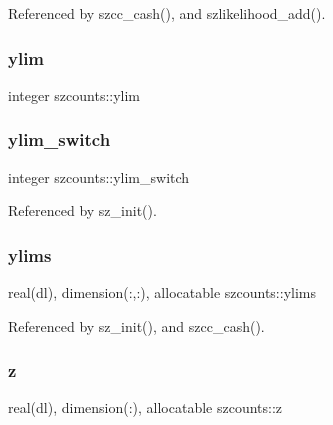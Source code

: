 Referenced by szcc\+\_\+cash(), and szlikelihood\+\_\+add().

\mbox{\label{namespaceszcounts_a2113fbfc3fd3f4f7d482dfc83ed3ce40}} 
\subsubsection{\texorpdfstring{ylim}{ylim}}
{\footnotesize\ttfamily integer szcounts\+::ylim\hspace{0.3cm}{\ttfamily [private]}}

\mbox{\label{namespaceszcounts_ac9b32f7b1676215c63a305f4ad36ac0a}} 
\subsubsection{\texorpdfstring{ylim\+\_\+switch}{ylim\_switch}}
{\footnotesize\ttfamily integer szcounts\+::ylim\+\_\+switch\hspace{0.3cm}{\ttfamily [private]}}



Referenced by sz\+\_\+init().

\mbox{\label{namespaceszcounts_a237475f3cddb3344fb45713300e0fe94}} 
\subsubsection{\texorpdfstring{ylims}{ylims}}
{\footnotesize\ttfamily real(dl), dimension(\+:,\+:), allocatable szcounts\+::ylims\hspace{0.3cm}{\ttfamily [private]}}



Referenced by sz\+\_\+init(), and szcc\+\_\+cash().

\mbox{\label{namespaceszcounts_a1bde530b627f5318a6681ddc544355d6}} 
\subsubsection{\texorpdfstring{z}{z}}
{\footnotesize\ttfamily real(dl), dimension(\+:), allocatable szcounts\+::z\hspace{0.3cm}{\ttfamily [private]}}



